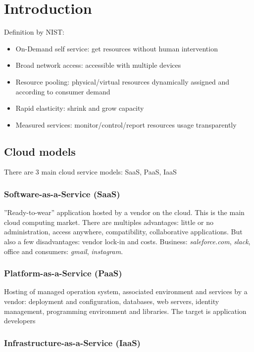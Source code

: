 \chapter{Introduction}

Definition by NIST:

\begin{itemize}
    \item On-Demand self service: get resources without human intervention
    \item Broad network access: accessible with multiple devices
    \item Resource pooling: physical/virtual resources dynamically assigned and according to consumer demand
    \item Rapid elasticity: shrink and grow capacity
    \item Measured services: monitor/control/report resources usage transparently
\end{itemize}

\section{Cloud models}

There are 3 main cloud service models: SaaS, PaaS, IaaS

\subsection{Software-as-a-Service (SaaS)}

”Ready-to-wear” application hosted by a vendor on the cloud. This is the main cloud computing market. There are multiples advantages: little or no administration, access anywhere, compatibility, collaborative applications. But also a few disadvantages: vendor lock-in and costs. Business: \textit{saleforce.com}, \textit{slack}, office and consumers: \textit{gmail}, \textit{instagram}.

\subsection{Platform-as-a-Service (PaaS)}

Hosting of managed operation system, associated environment and services by a vendor: deployment and configuration, databases, web servers, identity management, programming environment and libraries. The target is application developers

\subsection{Infrastructure-as-a-Service (IaaS)}

